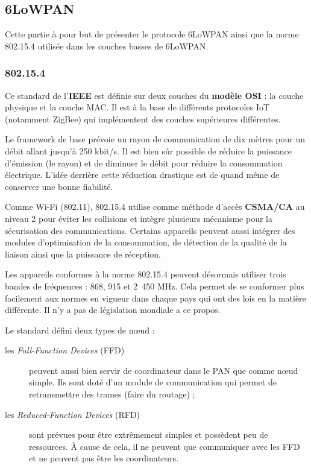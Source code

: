 
\subsection{6LoWPAN}

Cette partie à pour but de présenter le protocole 6LoWPAN ainsi que la norme 802.15.4 utilisée dans les couches basses de 6LoWPAN.

\subsubsection{802.15.4}

Ce standard de l'\textbf{IEEE} est définie sur deux couches du \textbf{modèle OSI} : la couche physique et la couche MAC. Il est à la base de différents protocoles IoT (notamment ZigBee) qui implémentent des couches supérieures différentes. 

Le framework de base prévoie un rayon de communication de dix mètres pour un débit allant jusqu'à 250 kbit/s. Il est bien sûr possible de réduire la puissance d'émission (le rayon) et de diminuer le débit pour réduire la consommation électrique. L'idée derrière cette réduction drastique est de quand même de conserver une bonne fiabilité.

Comme Wi-Fi (802.11), 802.15.4 utilise comme méthode d’accès \textbf{CSMA/CA} au niveau 2 pour éviter les collisions et intègre plusieurs mécanisme pour la sécurisation des communications. Certains appareils peuvent aussi intégrer des modules d'optimisation de la consommation, de détection de la qualité de la liaison ainsi que la puissance de réception. 

Les appareils conformes à la norme 802.15.4 peuvent désormais utiliser trois bandes de fréquences : 868, 915 et 2~450 MHz. Cela permet de se conformer plus facilement aux normes en vigueur dans chaque pays qui ont des lois en la matière différente. Il n'y a pas de législation mondiale a ce propos.

Le standard défini deux types de nœud :

\begin{description}
	\item[les \textit{Full-Function Devices} (FFD)] peuvent aussi bien servir de coordinateur dans le PAN que comme nœud simple. Ils sont doté d'un module de communication qui permet de retransmettre des trames (faire du routage) ;
	\item[les \textit{Reduced-Function Devices} (RFD)] sont prévues pour être extrêmement simples et possèdent peu de ressources. À cause de cela, il ne peuvent que communiquer avec les FFD et ne peuvent pas être les coordinateurs.
\end{description}

